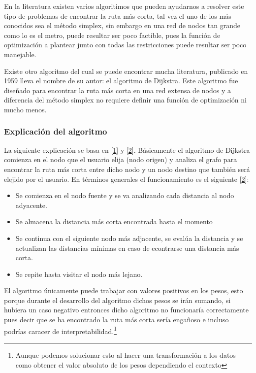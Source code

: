 \documentclass[
]{article}
\providecommand{\tightlist}{%
  \setlength{\itemsep}{0pt}\setlength{\parskip}{0pt}}
\begin{document}
En la literatura existen varios algoritimos que pueden ayudarnos a
resolver este tipo de problemas de encontrar la ruta más corta, tal vez
el uno de los más conocidos sea el método simplex, sin embargo en una
red de nodos tan grande como lo es el metro, puede resultar ser poco
factible, pues la función de optimización a plantear junto con todas las
restricciones puede resultar ser poco manejable.

Existe otro algoritmo del cual se puede encontrar mucha literatura,
publicado en 1959 lleva el nombre de su autor: el algoritmo de Dijkstra.
Este algoritmo fue diseñado para encontrar la ruta más corta en una red
extensa de nodos y a diferencia del método simplex no requiere definir
una función de optimización ni mucho menos.

\hypertarget{explicaciuxf3n-del-algoritmo}{%
\subsubsection{Explicación del
algoritmo}\label{explicaciuxf3n-del-algoritmo}}

La siguiente explicación se basa en
{[}\protect\hyperlink{ref-dijkstra2022note}{1}{]} y
{[}\protect\hyperlink{ref-noauthor_dijkstras_2020}{2}{]}. Básicamente el
algoritmo de Dijkstra comienza en el nodo que el usuario elija (nodo
origen) y analiza el grafo para encontrar la ruta más corta entre dicho
nodo y un nodo destino que también será elejido por el usuario. En
términos generales el funcionamiento es el siguiente
{[}\protect\hyperlink{ref-noauthor_dijkstras_2020}{2}{]}:

\begin{itemize}
\tightlist
\item
  Se comienza en el nodo fuente y se va analizando cada distancia al
  nodo adyacente.
\item
  Se almacena la distancia más corta encontrada hasta el momento
\item
  Se continua con el siguiente nodo más adjacente, se evalúa la
  distancia y se actualizan las distancias mínimas en caso de econtrarse
  una distancia más corta.
\item
  Se repite hasta visitar el nodo más lejano.
\end{itemize}

El algoritmo únicamente puede trabajar con valores positivos en los
pesos, esto porque durante el desarrollo del algoritmo dichos pesos se
irán sumando, si hubiera un caso negativo entronces dicho algoritmo no
funcionaría correctamente pues decir que se ha encontrado la ruta más
corta sería engañoso e incluso podrías caracer de
interpretabilidad.\footnote{Aunque podemos solucionar esto al hacer una
  transformación a los datos como obtener el valor absoluto de los pesos
  dependiendo el contexto}
\end{document}

